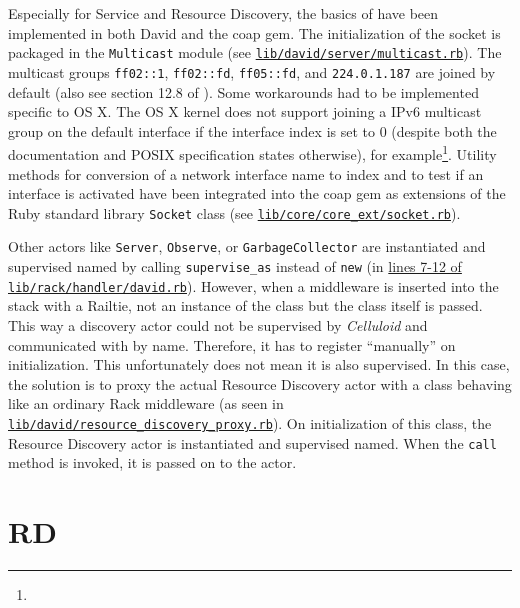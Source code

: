 	Especially for Service and Resource Discovery, the basics of
	\cite{coap-group} have been implemented in both David and the coap gem.
	The initialization of the socket is packaged in the \texttt{Multicast}
	module (see
	\href{https://github.com/nning/david/blob/0.4.3/lib/david/server/multicast.rb}{\texttt{lib/david/server/multicast.rb}}).
	The multicast groups \texttt{ff02::1}, \texttt{ff02::fd},
	\texttt{ff05::fd}, and \texttt{224.0.1.187} are joined by default (also see
	section 12.8 of \cite{coap}). Some workarounds had to be implemented
	specific to OS X. The OS X kernel does not support joining a \acs{IPv6}
	multicast group on the default interface if the interface index is set to 0
	(despite both the documentation and POSIX specification states otherwise),
	for example\footnote{\urlOsxMcast}. Utility methods for conversion of a
	network interface name to index and to test if an interface is activated
	have been integrated into the coap gem as extensions of the Ruby standard
	library \texttt{Socket} class (see
	\href{https://github.com/nning/coap/blob/0.1.1/lib/core/core_ext/socket.rb}{\texttt{lib/core/core\_ext/socket.rb}}).

	Other actors like \texttt{Server}, \texttt{Observe}, or
	\texttt{GarbageCollector} are instantiated and supervised named by calling
	\texttt{supervise\_as} instead of \texttt{new} (in
	\href{https://github.com/nning/david/blob/0.4.3/lib/rack/handler/david.rb#L7}{lines
	7-12 of \texttt{lib/rack/handler/david.rb}}). However, when a
	middleware is inserted into the stack with a Railtie, not an instance of
	the class but the class itself is passed. This way a discovery actor could
	not be supervised by \emph{Celluloid} and communicated with by name.
	Therefore, it has to register \enquote{manually} on initialization. This
	unfortunately does not mean it is also supervised. In this case, the
	solution is to proxy the actual Resource Discovery actor with a class
	behaving like an ordinary Rack middleware (as seen in
	\href{https://github.com/nning/david/blob/0.4.3/lib/david/resource_discovery_proxy.rb}{\texttt{lib/david/resource\_discovery\_proxy.rb}}).
	On initialization of this class, the Resource Discovery actor is
	instantiated and supervised named. When the \texttt{call} method is
	invoked, it is passed on to the actor.

\section{\acf{RD}}
\label{cha:implementation:core-rd}

